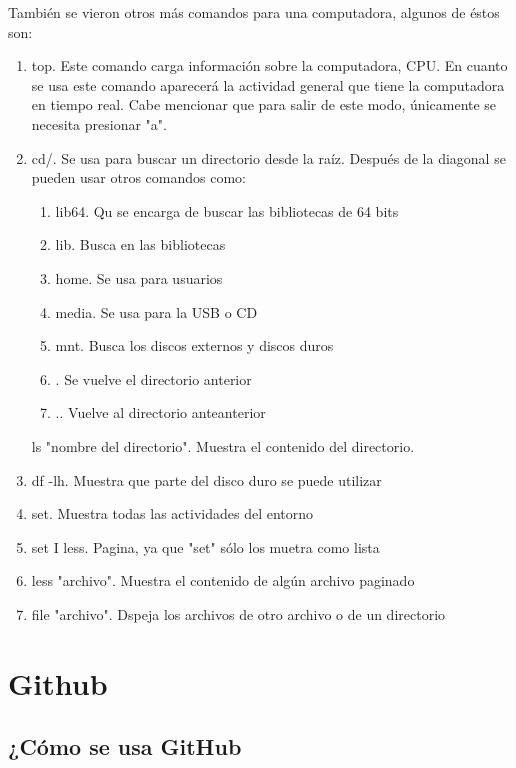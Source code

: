 \documentclass{book}
\begin{document}
\begin{enumerate}
\begin{enumerate}
	 También se vieron otros más comandos para una computadora, algunos de éstos son:
		\begin{enumerate}
			\item 
		top. Este comando carga información sobre la computadora, CPU. En cuanto se usa este comando aparecerá la actividad general que tiene la computadora en tiempo real. Cabe mencionar que para salir de este modo, únicamente se necesita presionar "a".
			\item 
		cd/. Se usa para buscar un directorio desde la raíz. Después de la diagonal se pueden usar otros comandos como:
			\begin{enumerate}
			\item 
			lib64. Qu se encarga de buscar las bibliotecas de 64 bits
			\item 
			lib. Busca en las bibliotecas
			\item 
			home. Se usa para usuarios
			\item 
			media. Se usa para la USB o CD
			\item 
			mnt. Busca los discos externos y discos duros
			\item 
			. Se vuelve el directorio anterior
			\item 
			.. Vuelve al directorio anteanterior
			\end{enumerate}
		ls "nombre del directorio". Muestra el contenido del directorio.
		\item
		df -lh. Muestra que parte del disco duro se puede utilizar
		\item 
		set. Muestra todas las actividades del entorno
		\item 
		set I less. Pagina, ya que "set" sólo los muetra como lista
		\item 
		less "archivo". Muestra el contenido de algún archivo paginado
		\item 
		file "archivo". Dspeja los archivos de otro archivo o de un directorio
		\end{enumerate}
	\end{enumerate}
	\end{enumerate}

	\chapter{Github}
	\section{¿Cómo se usa GitHub}
	
\end{document}
